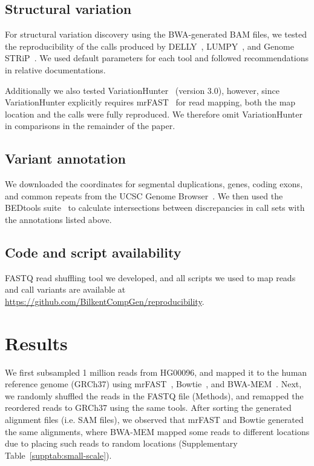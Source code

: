 \documentclass[10pt,a4paper]{article}
\begin{document}
\subsection{Structural variation}

For structural variation discovery using the BWA-generated BAM files, we tested the reproducibility of the calls produced by DELLY~\cite{Rausch2012}, LUMPY~\cite{Layer2014}, and Genome STRiP~\cite{Handsaker2011,Handsaker2015}. 
We used default parameters for each tool and followed recommendations in relative documentations.

Additionally we also tested VariationHunter~\cite{Hormozdiari2009,Hormozdiari2010} (version 3.0), however, since VariationHunter explicitly requires mrFAST~\cite{Alkan2009,Xin2013} for read mapping, 
both the map location and the calls were fully reproduced. We therefore omit VariationHunter in comparisons in the remainder of the paper.

\subsection{Variant annotation}

We downloaded the coordinates for segmental duplications, genes, coding exons, and common repeats from the UCSC Genome Browser~\cite{Kent2002}. 
We then used the BEDtools suite~\cite{Quinlan2010a} to calculate intersections between discrepancies in call sets with the annotations listed above.

\subsection{Code and script availability} FASTQ read shuffling tool we developed, and all scripts we used to map reads and call variants are available at 
\url{https://github.com/BilkentCompGen/reproducibility}.

\section{Results}
We first subsampled 1 million reads from HG00096, and mapped it to the human reference genome (GRCh37) using mrFAST~\cite{Alkan2009,Xin2013}, Bowtie~\cite{Langmead2009}, and BWA-MEM~\cite{Li2009a,Li2013}.
Next, we randomly shuffled the reads in the FASTQ file (Methods), and remapped the reordered reads to GRCh37 using the same tools.
After sorting the generated alignment files (i.e. SAM files), we observed that mrFAST and Bowtie generated the same alignments, where BWA-MEM mapped some reads to different locations due to placing 
such reads to random locations (Supplementary Table~\ref{supptab:small-scale}).
\end{document}
